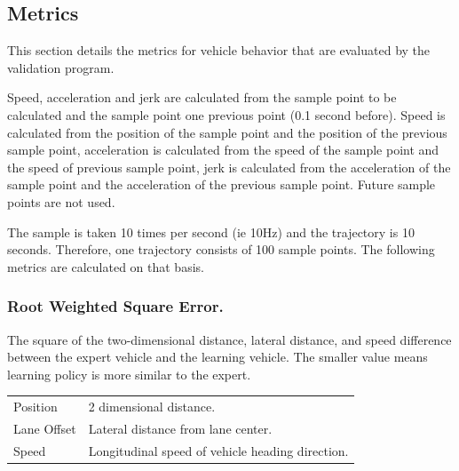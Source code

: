 \subsection{Metrics}


This section details the metrics for vehicle behavior that are evaluated by the validation program.

Speed, acceleration and jerk are calculated from the sample point to be calculated and the sample point one previous point (0.1 second before).
Speed is calculated from the position of the sample point and the position of the previous sample point, acceleration is calculated from the speed of the sample point and the speed of previous sample point, jerk is calculated from the acceleration of the sample point and the acceleration of the previous sample point.
Future sample points are not used.

The sample is taken 10 times per second (ie 10Hz) and the trajectory is 10 seconds. Therefore, one trajectory consists of 100 sample points.
The following metrics are calculated on that basis.

\subsubsection{Root Weighted Square Error.}

The square of the two-dimensional distance, lateral distance, and speed difference between the expert vehicle and the learning vehicle. The smaller value means learning policy is more similar to the expert.

\begin{tabular}{ll}
Position & 2 dimensional distance.  \\
Lane Offset & Lateral distance from lane center. \\
Speed & Longitudinal speed of vehicle heading direction. \\
\end{tabular}



